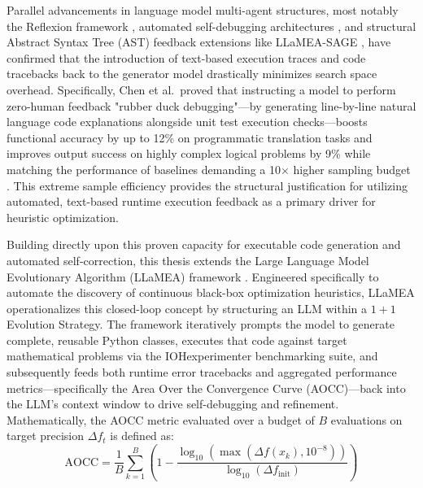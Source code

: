 Parallel advancements in language model multi-agent structures, most notably the Reflexion framework \cite{Shinn2023}, automated self-debugging architectures \cite{Chen2023}, and structural Abstract Syntax Tree (AST) feedback extensions like LLaMEA-SAGE \cite{LLaMEASAGE2026}, have confirmed that the introduction of text-based execution traces and code tracebacks back to the generator model drastically minimizes search space overhead. Specifically, Chen et al.\ proved that instructing a model to perform zero-human feedback "rubber duck debugging"—by generating line-by-line natural language code explanations alongside unit test execution checks—boosts functional accuracy by up to 12\% on programmatic translation tasks and improves output success on highly complex logical problems by 9\% while matching the performance of baselines demanding a 10$\times$ higher sampling budget \cite{Chen2023}. This extreme sample efficiency provides the structural justification for utilizing automated, text-based runtime execution feedback as a primary driver for heuristic optimization.

Building directly upon this proven capacity for executable code generation and automated self-correction, this thesis extends the Large Language Model Evolutionary Algorithm (LLaMEA) framework \cite{LLaMEA2024}. Engineered specifically to automate the discovery of continuous black-box optimization heuristics, LLaMEA operationalizes this closed-loop concept by structuring an LLM within a $1+1$ Evolution Strategy. The framework iteratively prompts the model to generate complete, reusable Python classes, executes that code against target mathematical problems via the IOHexperimenter benchmarking suite, and subsequently feeds both runtime error tracebacks and aggregated performance metrics—specifically the Area Over the Convergence Curve (AOCC)—back into the LLM's context window to drive self-debugging and refinement. Mathematically, the AOCC metric evaluated over a budget of $B$ evaluations on target precision $\Delta f_t$ is defined as:
\begin{equation}
    \text{AOCC} = \frac{1}{B} \sum_{k=1}^{B} \left( 1 - \frac{\log_{10}(\max(\Delta f(x_k), 10^{-8}))}{\log_{10}(\Delta f_{\text{init}})} \right)
\end{equation}

